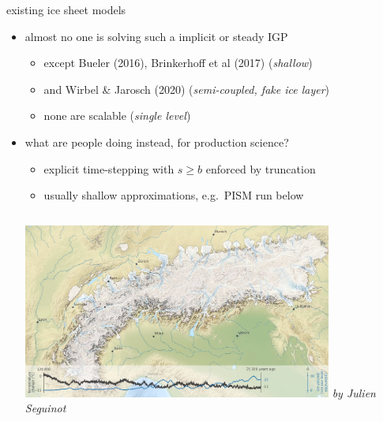 \documentclass[usepdftitle=false,usenames,dvipsnames]{beamer}
\begin{document}
\begin{frame}{existing ice sheet models}

\begin{itemize}
\item almost no one is solving such a implicit or steady IGP
    \begin{itemize}
    \item except Bueler (2016), Brinkerhoff et al (2017) (\emph{shallow})
    \item and Wirbel \& Jarosch (2020) (\emph{semi-coupled, fake ice layer})
    \item none are scalable (\emph{single level})
    \end{itemize}
\item what are people doing instead, for production science?
    \begin{itemize}
    \item \alert{explicit time-stepping with $s \ge b$ enforced by truncation}
    \item usually shallow approximations, e.g.~PISM run below
    \end{itemize}

\medskip
\begin{columns}
        \includegraphics[width=0.8\textwidth]{figs/seguinot.png}
        \scriptsize \emph{by Julien Seguinot}
\end{columns}
\end{itemize}
\end{frame}
\end{document}
